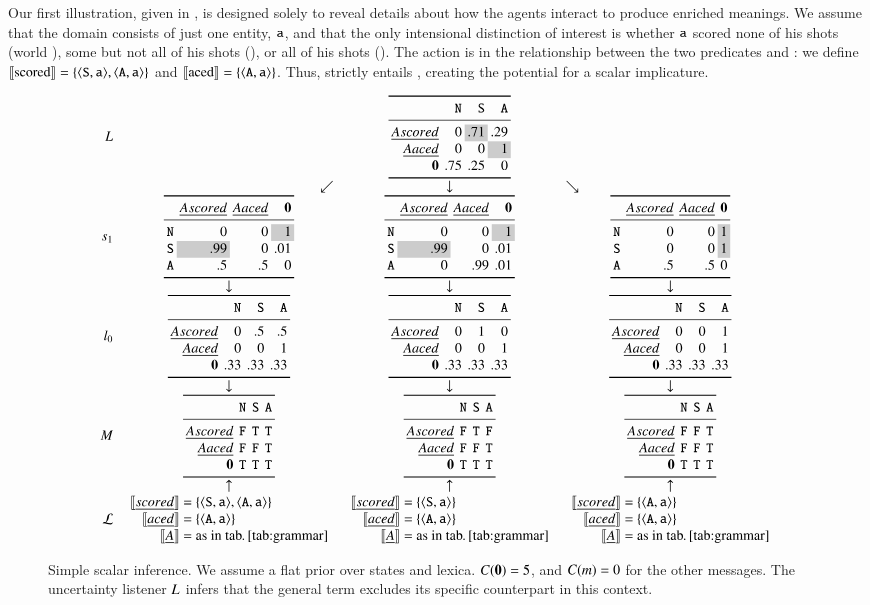 \documentclass[leqno,12pt]{article}
\begin{document}
Our first illustration, given in , is
designed solely to reveal details about how the agents interact to
produce enriched meanings. We assume that the domain consists of just
one entity, $\texttt{a}$, and that the only intensional distinction of
interest is whether $\texttt{a}$ scored none of his shots (world
), some but not all of his shots (), or all of his
shots (). The action is in the relationship between the two
predicates  and : we define $\llbracket\text{scored}\rrbracket =
\left\{ \langle \texttt{S}, \texttt{a} \rangle, \langle \texttt{A}, \texttt{a} \rangle \right\}$ and
$\llbracket\text{aced}\rrbracket = \left\{ \langle \texttt{A}, \texttt{a} \rangle \right\}$. Thus, 
strictly entails , creating the potential for a scalar
implicature.

\begin{figure}[!ht]
  \[
  \setlength{\arraycolsep}{4pt}
  \begin{array}{r c c c}
    \UncertaintyListener &
    & \genericscalar{0}{\graycell{.71}}{.29}{0}{0}{\graycell{1}}{.75}{.25}{0}
    \\
    & \multicolumn{1}{r}{\swarrow}& \multicolumn{1}{c}{\downarrow}& \multicolumn{1}{l}{\searrow}
    \\
    \speakerOne
    &
    \scalarspeaker{0}{0}{\graycell{1}}{\graycell{.99}}{0}{.01}{.5}{.5}{0}
    &
    \scalarspeaker{0}{0}{\graycell{1}}{\graycell{.99}}{0}{.01}{0}{.99}{.01}
    &
    \scalarspeaker{0}{0}{\graycell{1}}{0}{0}{\graycell{1}}{.5}{.5}{0}
    \\
    & \downarrow & \downarrow & \downarrow
    \\
    \listenerZero
    &
    \genericscalar{0}{.5}{.5}{0}{0}{1}{.33}{.33}{.33}
    &
    \genericscalar{0}{1}{0}{0}{0}{1}{.33}{.33}{.33}
    &
    \genericscalar{0}{0}{1}{0}{0}{1}{.33}{.33}{.33}
    \\
    & \downarrow & \downarrow & \downarrow 
    \\    
    \Messages
    &
    \genericscalar{\False}{\True}{\True}{\False}{\False}{\True}{\True}{\True}{\True}
    &
    \genericscalar{\False}{\True}{\False}{\False}{\False}{\True}{\True}{\True}{\True}
    &
    \genericscalar{\False}{\False}{\True}{\False}{\False}{\True}{\True}{\True}{\True}
    \\
    & \uparrow & \uparrow & \uparrow 
    \\                               
    \Lex
    & 
    \scalarlex{\tuple{\world{S},\playera}, \tuple{\world{A},\playera}}
    & 
    \scalarlex{\tuple{\world{S},\playera}}
    &
    \scalarlex{\tuple{\world{A},\playera}}   
  \end{array}
  \]
  \caption{Simple scalar inference. 
    We assume a flat prior over states and lexica. 
    $C(\mathbf{0}) = 5$, and $C(m) = 0$ for the other messages. 
    The uncertainty listener $L$ infers that the general term 
     excludes its specific counterpart  in this context.}
  \label{fig:simplescalar}
\end{figure}
\end{document}
